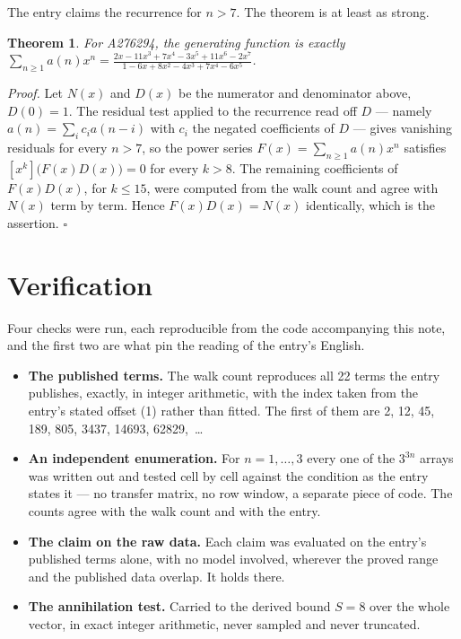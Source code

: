 \documentclass[11pt]{article}
\newtheorem{theorem}{Theorem}
\theoremstyle{definition}
\begin{document}
The entry claims the recurrence for $n > 7$. The theorem is at least as strong.

\begin{theorem} For A276294, the generating function is exactly $\sum_{n\ge 1} a(n)x^n = \frac{2x - 11x^{3} + 7x^{4} - 3x^{5} + 11x^{6} - 2x^{7}}{1 - 6x + 8x^{2} - 4x^{3} + 7x^{4} - 6x^{5}}$.\end{theorem}

{\itshape Proof.} Let $N(x)$ and $D(x)$ be the numerator and denominator above, $D(0)=1$. The residual test applied to the recurrence read off $D$ --- namely $a(n) = \sum_i c_i a(n-i)$ with $c_i$ the negated coefficients of $D$ --- gives vanishing residuals for every $n > 7$, so the power series $F(x)=\sum_{n\ge 1}a(n)x^n$ satisfies $[x^k]\bigl(F(x)D(x)\bigr) = 0$ for every $k > 8$. The remaining coefficients of $F(x)D(x)$, for $k \le 15$, were computed from the walk count and agree with $N(x)$ term by term. Hence $F(x)D(x) = N(x)$ identically, which is the assertion. $\square$

\section{Verification}

Four checks were run, each reproducible from the code accompanying this note, and the first two are what pin the reading of the entry's English.

\begin{itemize}

\item {\bfseries The published terms.} The walk count reproduces all 22 terms the entry publishes, exactly, in integer arithmetic, with the index taken from the entry's stated offset (1) rather than fitted. The first of them are 2, 12, 45, 189, 805, 3437, 14693, 62829,~\dots

\item {\bfseries An independent enumeration.} For $n = 1,\dots,3$ every one of the $3^{3n}$ arrays was written out and tested cell by cell against the condition as the entry states it --- no transfer matrix, no row window, a separate piece of code. The counts agree with the walk count and with the entry.

\item {\bfseries The claim on the raw data.} Each claim was evaluated on the entry's published terms alone, with no model involved, wherever the proved range and the published data overlap. It holds there.

\item {\bfseries The annihilation test.} Carried to the derived bound $S = 8$ over the whole vector, in exact integer arithmetic, never sampled and never truncated.

\end{itemize}
\end{document}
